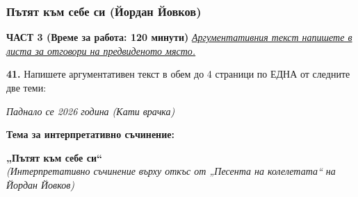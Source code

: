 \documentclass[12pt,a4paper]{article}
\begin{document}
\subsubsection{Пътят към себе си (Йордан Йовков)}
\vspace{0.5cm}
\begin{center}
\textbf{ЧАСТ 3 (Време за работа: 120 минути)}
\vspace{0.2cm}
{\textit{\underline{Аргументативния текст напишете в листа за отговори на предвиденото място.}}}
\vspace{0.1cm}
\end{center}
\textbf{41.} Напишете аргументативен текст в обем до 4 страници по ЕДНА от следните две теми:
\vspace{-0.7cm}
\begin{center}
\textit{Паднало се 2026 година (Кати врачка)}
\end{center}
\vspace{-0.4cm}

\vspace{0.2cm}
\textbf{Тема за интерпретативно съчинение:}
\vspace{0.1cm}
\begin{center}
\textbf{„Пътят към себе си“}
\\
\textit{(Интерпретативно съчинение върху откъс от  „Песента на колелетата“ на Йордан Йовков)}
\end{center}
\end{document}
